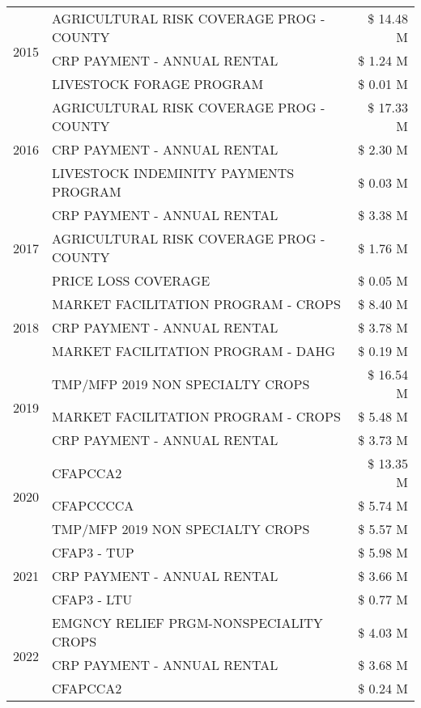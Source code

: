 \begin{tabular}{llr}
\cline{1-3}
\multirow[t]{3}{*}{2015} & AGRICULTURAL RISK COVERAGE PROG - COUNTY & \$ 14.48 M \\
 & CRP PAYMENT - ANNUAL RENTAL & \$ 1.24 M \\
 & LIVESTOCK FORAGE PROGRAM & \$ 0.01 M \\
\cline{1-3}
\multirow[t]{3}{*}{2016} & AGRICULTURAL RISK COVERAGE PROG - COUNTY & \$ 17.33 M \\
 & CRP PAYMENT - ANNUAL RENTAL & \$ 2.30 M \\
 & LIVESTOCK INDEMINITY PAYMENTS PROGRAM & \$ 0.03 M \\
\cline{1-3}
\multirow[t]{3}{*}{2017} & CRP PAYMENT - ANNUAL RENTAL & \$ 3.38 M \\
 & AGRICULTURAL RISK COVERAGE PROG - COUNTY & \$ 1.76 M \\
 & PRICE LOSS COVERAGE & \$ 0.05 M \\
\cline{1-3}
\multirow[t]{3}{*}{2018} & MARKET FACILITATION PROGRAM - CROPS & \$ 8.40 M \\
 & CRP PAYMENT - ANNUAL RENTAL & \$ 3.78 M \\
 & MARKET FACILITATION PROGRAM - DAHG & \$ 0.19 M \\
\cline{1-3}
\multirow[t]{3}{*}{2019} & TMP/MFP 2019 NON SPECIALTY CROPS & \$ 16.54 M \\
 & MARKET FACILITATION PROGRAM - CROPS & \$ 5.48 M \\
 & CRP PAYMENT - ANNUAL RENTAL & \$ 3.73 M \\
\cline{1-3}
\multirow[t]{3}{*}{2020} & CFAPCCA2 & \$ 13.35 M \\
 & CFAPCCCCA & \$ 5.74 M \\
 & TMP/MFP 2019 NON SPECIALTY CROPS & \$ 5.57 M \\
\cline{1-3}
\multirow[t]{3}{*}{2021} & CFAP3 - TUP & \$ 5.98 M \\
 & CRP PAYMENT - ANNUAL RENTAL & \$ 3.66 M \\
 & CFAP3 - LTU & \$ 0.77 M \\
\cline{1-3}
\multirow[t]{3}{*}{2022} & EMGNCY RELIEF PRGM-NONSPECIALITY CROPS & \$ 4.03 M \\
 & CRP PAYMENT - ANNUAL RENTAL & \$ 3.68 M \\
 & CFAPCCA2 & \$ 0.24 M \\
\cline{1-3}
\bottomrule
\end{tabular}
